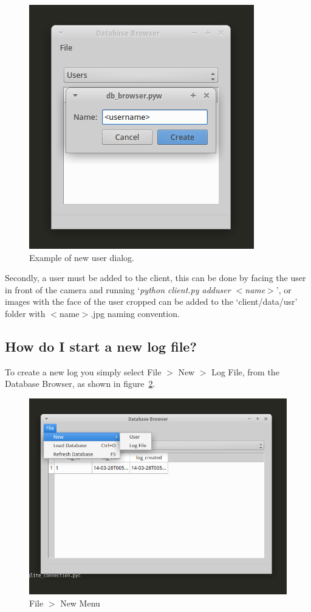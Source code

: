 \documentclass[a4paper]{article}
\begin{document}
        \begin{figure}[H]
            \centering
            \caption{Example of new user dialog.}
            \label{fig:dbadduser}
                \includegraphics[scale=0.7]{../shared_assets/screenshots/manual/dbadduser.png}
        \end{figure}

        Secondly, a user must be added to the client, this can be done by facing the user in front of the camera and running `\textit{python client.py adduser $<$name$>$}',
        or images with the face of the user cropped can be added to the `client/data/usr' folder with $<$name$>$.jpg naming convention.
    \newpage
    \subsection{How do I start a new log file?}
        To create a new log you simply select File $>$ New $>$ Log File, from the Database Browser, as shown in figure~\ref{fig:dbaddlog}.

        \begin{figure}[H]
            \centering
            \caption{File $>$ New Menu}
            \label{fig:dbaddlog}
                \includegraphics[scale=0.5]{../shared_assets/screenshots/manual/dbaddlog.png}
        \end{figure}        
\end{document}
